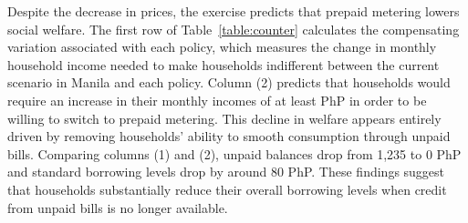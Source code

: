 \documentclass[12pt,table]{article}
\begin{document}
Despite the decrease in prices, the exercise predicts that prepaid metering lowers social welfare.  The first row of Table~\ref{table:counter} calculates the compensating variation associated with each policy, which measures the change in monthly household income needed to make households indifferent between the current scenario in Manila and each policy.  Column (2) predicts that households would require an increase in their monthly incomes of at least PhP in order to be willing to switch to prepaid metering.   This decline in welfare appears entirely driven by removing households' ability to smooth consumption through unpaid bills.  Comparing columns (1) and (2), unpaid balances drop from 1,235 to 0 PhP and standard borrowing levels drop by around 80 PhP.  These findings suggest that households substantially reduce their overall borrowing levels when credit from unpaid bills is no longer available.   %
\end{document}
